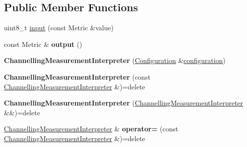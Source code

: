 \subsection*{Public Member Functions}
\begin{DoxyCompactItemize}
\item 
uint8\+\_\+t \mbox{\hyperlink{classanalyzer_1_1_channelling_measurement_interpreter_a2b92812e74d1905838afc28805121315}{input}} (const Metric \&value)
\item 
\mbox{\label{classanalyzer_1_1_channelling_measurement_interpreter_a562231e73b3d676592a7263d7e99c510}} 
const Metric \& {\bfseries output} ()
\item 
\mbox{\label{classanalyzer_1_1_channelling_measurement_interpreter_a0187a23b0be50902b935c712448cd8a7}} 
{\bfseries Channelling\+Measurement\+Interpreter} (\mbox{\hyperlink{classanalyzer_1_1_channelling_measurement_interpreter_1_1_configuration}{Configuration}} \&\mbox{\hyperlink{classanalyzer_1_1_channelling_measurement_interpreter_aa0400f90781b78ae78980f391880f136}{configuration}})
\item 
\mbox{\label{classanalyzer_1_1_channelling_measurement_interpreter_a1187347e4142d00b79fc685c1f4abaed}} 
{\bfseries Channelling\+Measurement\+Interpreter} (const \mbox{\hyperlink{classanalyzer_1_1_channelling_measurement_interpreter}{Channelling\+Measurement\+Interpreter}} \&)=delete
\item 
\mbox{\label{classanalyzer_1_1_channelling_measurement_interpreter_a7615b2bab2b6963a2beb43a027120b58}} 
{\bfseries Channelling\+Measurement\+Interpreter} (\mbox{\hyperlink{classanalyzer_1_1_channelling_measurement_interpreter}{Channelling\+Measurement\+Interpreter}} \&\&)=delete
\item 
\mbox{\label{classanalyzer_1_1_channelling_measurement_interpreter_a21809034b391e3047d712076ff356262}} 
\mbox{\hyperlink{classanalyzer_1_1_channelling_measurement_interpreter}{Channelling\+Measurement\+Interpreter}} \& {\bfseries operator=} (const \mbox{\hyperlink{classanalyzer_1_1_channelling_measurement_interpreter}{Channelling\+Measurement\+Interpreter}} \&)=delete

\end{DoxyCompactItemize}
